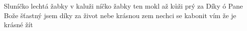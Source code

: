 \begin{TEXT}{Sluníčko lechtá žabky v kaluži}
\SLOKA {}níčko  žabky  \NL
{} ten mokl až  kůži \NL
{}  prý   za 
\SLOKA Díky ó Pane Bože šťastný jsem \NL
díky za život nebe krásnou zem \NL
nechci se kabonit vím že je krásné žít \NL
\end{TEXT}
